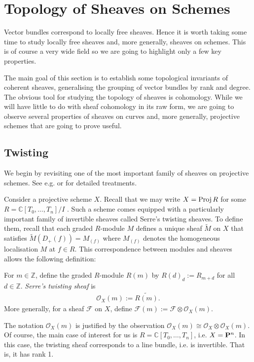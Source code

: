 \documentclass[12pt]{ociamthesis}  %
\begin{document}
\section{Topology of Sheaves on Schemes}

Vector bundles correspond to locally free sheaves. Hence it is worth
taking some time to study locally free sheaves and, more generally,
sheaves on schemes. This is of course a very wide field
so we are going to highlight only a few key properties.

The main goal of this section is to establish some topological
invariants of coherent sheaves, generalising the grouping of
vector bundles by rank and degree. The obvious tool for studying
the topology of sheaves is cohomology. While we will have little
to do with sheaf cohomology in its raw form, we are going to
observe several properties of sheaves on curves and, more generally,
projective schemes that are going to prove useful.

\subsection{Twisting}

We begin by revisiting one of the most important family of sheaves
on projective schemes. See e.g. \cite{gortz2010} or
\cite{hartshorne1977} for detailed treatments.

Consider a projective scheme $X$. Recall that we may write
$X=\operatorname{Proj} R$ for some $R=\mathbb{C}[T_0,\ldots,T_n]/I$ \cite[II Corollary 5.16]{hartshorne1977}. Such a scheme comes
equipped with a particularly important family of invertible sheaves
called Serre's twisting sheaves. To define them, recall that each
graded $R$-module $M$ defines a unique sheaf $\tilde M$ on $X$
that satisfies $\tilde M (D_+(f)) = M_{(f)}$ where $M_{(f)}$
denotes the homogeneous localisation $M$ at $f\in R$. This
correspondence between modules and sheaves allows the following
definition:

\begin{definition}
  For $m\in\mathbb{Z}$, define the graded $R$-module $R(m)$ by
  $R(d)_d := R_{m+d}$ for all $d\in\mathbb{Z}$. \emph{Serre's
    twisting sheaf} is
  \begin{align*}
    \mathscr O_X(m) := \widetilde{R(m)}.
  \end{align*}
  More generally, for a sheaf $\mathscr F$ on $X$, define
  $\mathscr F(m) := \mathscr F \otimes \mathscr O_X(m)$.
\end{definition}
The notation $\mathscr O_X(m)$ is justified by the observation
$\mathscr O_X(m) \cong \mathscr O_X \otimes \mathscr O_X(m)$.
Of course, the main case of interest for us is
$R=\mathbb{C}[T_0,\ldots,T_n]$, i.e. $X=\mathbf{P}^{n}_{}$.
In this case, the twisting sheaf corresponds to a line bundle,
i.e. is invertible. That is, it has rank 1.
\end{document}
